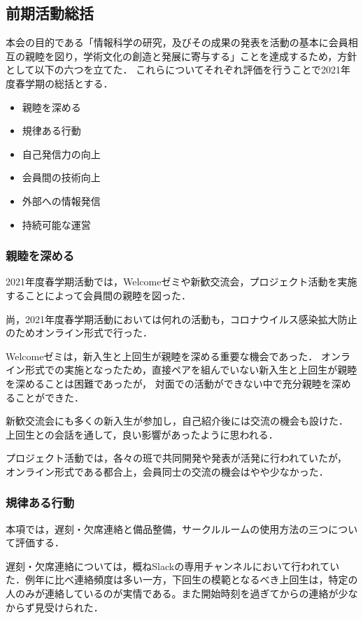 \subsection*{前期活動総括}


本会の目的である「情報科学の研究，及びその成果の発表を活動の基本に会員相互の親睦を図り，学術文化の創造と発展に寄与する」ことを達成するため，方針として以下の六つを立てた．
これらについてそれぞれ評価を行うことで2021年度春学期の総括とする．

\begin{itemize}
    \item 親睦を深める
    \item 規律ある行動
    \item 自己発信力の向上
    \item 会員間の技術向上
    \item 外部への情報発信
    \item 持続可能な運営
\end{itemize}

\subsubsection*{親睦を深める}
    2021年度春学期活動では，Welcomeゼミや新歓交流会，プロジェクト活動を実施することによって会員間の親睦を図った．

    尚，2021年度春学期活動においては何れの活動も，コロナウイルス感染拡大防止のためオンライン形式で行った．

    Welcomeゼミは，新入生と上回生が親睦を深める重要な機会であった．
    オンライン形式での実施となったため，直接ペアを組んでいない新入生と上回生が親睦を深めることは困難であったが，
    対面での活動ができない中で充分親睦を深めることができた．

    新歓交流会にも多くの新入生が参加し，自己紹介後には交流の機会も設けた．
    上回生との会話を通して，良い影響があったように思われる．

    プロジェクト活動では，各々の班で共同開発や発表が活発に行われていたが，
    オンライン形式である都合上，会員同士の交流の機会はやや少なかった．

\subsubsection*{規律ある行動}
    本項では，遅刻・欠席連絡と備品整備，サークルルームの使用方法の三つについて評価する．

    遅刻・欠席連絡については，概ねSlackの専用チャンネルにおいて行われていた．例年に比べ連絡頻度は多い一方，下回生の模範となるべき上回生は，特定の人のみが連絡しているのが実情である。また開始時刻を過ぎてからの連絡が少なからず見受けられた．

